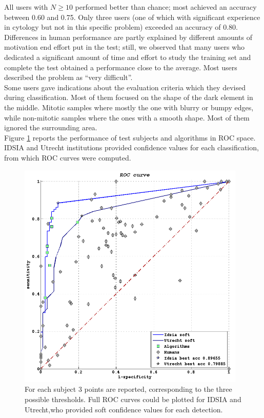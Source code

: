 All users with $N \geq 10$ performed better than chance; most achieved an
accuracy between 0.60 and 0.75. Only three users (one of which with significant experience in cytology but not in this specific problem)
exceeded an accuracy of 0.80. Differences in human performance are partly explained by different
amounts of motivation end effort put in the test; still, we observed that many
users who dedicated a significant amount of time and effort to study the training set and complete the test obtained a performance close to the average.
Most users described the problem as \textquotedblleft{}very difficult\textquotedblright.\\
Some users gave indications about the evaluation criteria which they devised during classification. Most of them focused on the shape of the dark element in the middle.
Mitotic samples where mostly the one with blurry or bumpy edges, while non-mitotic samples where the ones with a smooth shape.
Most of them ignored the surrounding area.\\
Figure \ref{ch6:fig22} reports the performance of test subjects and algorithms in \Gls{ROC} space. IDSIA and Utrecht institutions provided confidence values for each classification,
from which \Gls{ROC} curves were computed.

\begin{figure}[!htb]
   \begin{center}
    \includegraphics[width=0.97\textwidth]{./images/Ch6/Fig22/class_alg_crop.png}
    \caption[ROC plot humans vs. algorithms]{For each subject 3 points are reported, corresponding to the three possible thresholds.
    Full ROC curves could be plotted for IDSIA and Utrecht,who provided soft confidence values for each detection.}
    \label{ch6:fig22}
    \end{center}
\end{figure}

